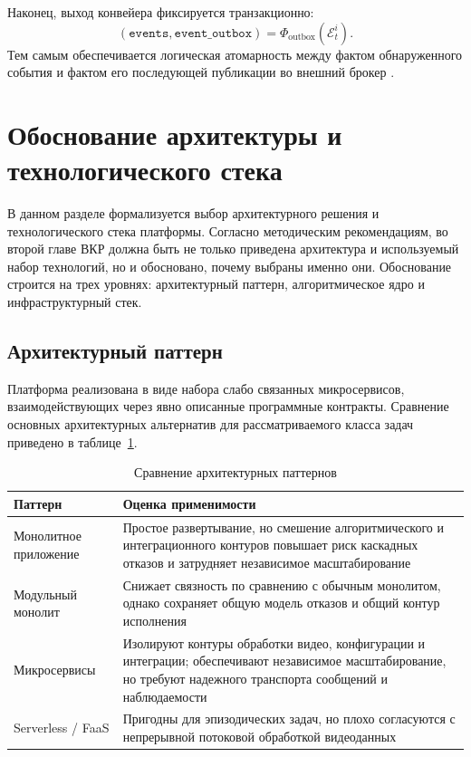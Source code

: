 Наконец, выход конвейера фиксируется транзакционно:
\begin{equation}
(\texttt{events}, \texttt{event\_outbox}) = \Phi_{\text{outbox}}(\mathcal{E}^i_t).
\end{equation}
Тем самым обеспечивается логическая атомарность между фактом обнаруженного события и фактом его последующей публикации во внешний брокер \cite{transactional_outbox,rabbitmq_docs}.

\section{Обоснование архитектуры и технологического стека}
\label{sec:stack_rationale}

В данном разделе формализуется выбор архитектурного решения и технологического стека платформы. Согласно методическим рекомендациям, во второй главе ВКР должна быть не только приведена архитектура и используемый набор технологий, но и обосновано, почему выбраны именно они. Обоснование строится на трех уровнях: архитектурный паттерн, алгоритмическое ядро и инфраструктурный стек.

\subsection{Архитектурный паттерн}

Платформа реализована в виде набора слабо связанных микросервисов, взаимодействующих через явно описанные программные контракты. Сравнение основных архитектурных альтернатив для рассматриваемого класса задач приведено в таблице~\ref{tab:arch_pattern_choice}.

\begin{table}[H]
\caption{Сравнение архитектурных паттернов}
\label{tab:arch_pattern_choice}
\begin{tabularx}{\textwidth}{>{\raggedright\arraybackslash}p{}X}
\toprule
Паттерн & Оценка применимости \\
\midrule
Монолитное приложение & Простое развертывание, но смешение алгоритмического и интеграционного контуров повышает риск каскадных отказов и затрудняет независимое масштабирование \\
Модульный монолит & Снижает связность по сравнению с обычным монолитом, однако сохраняет общую модель отказов и общий контур исполнения \\
Микросервисы & Изолируют контуры обработки видео, конфигурации и интеграции; обеспечивают независимое масштабирование, но требуют надежного транспорта сообщений и наблюдаемости \\
Serverless / FaaS & Пригодны для эпизодических задач, но плохо согласуются с непрерывной потоковой обработкой видеоданных \\
\bottomrule
\end{tabularx}
\end{table}

